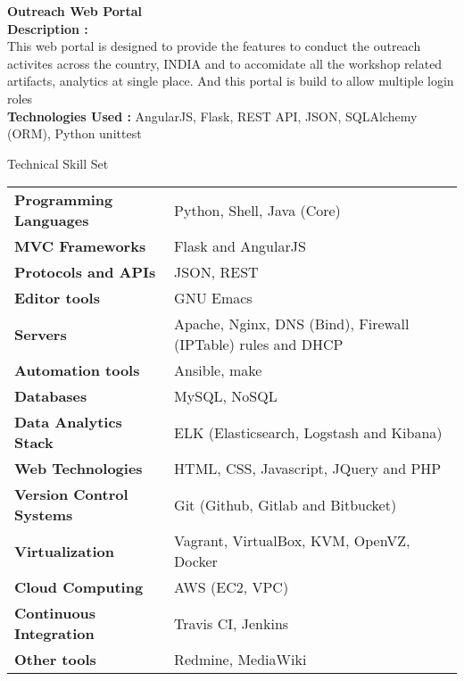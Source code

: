 \documentclass{resume} %
\begin{document}
\bigskip
\textbf{Outreach Web Portal} \\ \textbf{Description :}
\\ This web portal is designed to provide the features to
conduct the outreach activites across the country, INDIA and
to accomidate all the workshop related artifacts, analytics
at single place. And this portal is build to allow multiple
login roles \\ \textbf{Technologies Used :} AngularJS,
Flask, REST API, JSON, SQLAlchemy (ORM), Python unittest




\begin{rSection}
  {Technical Skill Set}

  \begin{tabular}{ @{} >{\bfseries}l @{\hspace{6ex}} l }
    Programming Languages & Python, Shell, Java (Core)
    \\ MVC Frameworks & Flask and AngularJS\\ Protocols and
    APIs & JSON, REST \\ Editor tools & GNU Emacs \\ Servers
    & Apache, Nginx, DNS (Bind), Firewall (IPTable) rules
    and DHCP \\ Automation tools & Ansible, make
    \\ Databases & MySQL, NoSQL \\ Data Analytics Stack &
    ELK (Elasticsearch, Logstash and Kibana) \\ Web
    Technologies & HTML, CSS, Javascript, JQuery and PHP
    \\ Version Control Systems & Git (Github, Gitlab and
    Bitbucket) \\ Virtualization & Vagrant, VirtualBox, KVM,
    OpenVZ, Docker \\ Cloud Computing & AWS (EC2, VPC)
    \\ Continuous Integration & Travis CI, Jenkins \\ Other
    tools & Redmine, MediaWiki
    
  \end{tabular}

\end{rSection}
\end{document}
